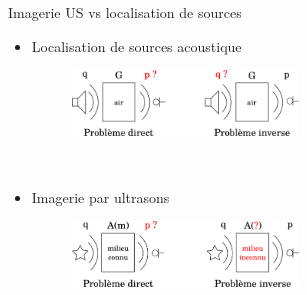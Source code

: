 \begin{frame}{Imagerie US vs localisation de sources}
	\begin{itemize}
		\item<1-> Localisation de sources acoustique
		\begin{figure}
			\includegraphics[width = 6cm]{./img/pd_dir_inv/ac.png}
		\end{figure}~\\
		\item<2-> Imagerie par ultrasons
		\begin{figure}
			\includegraphics[width = 6cm]{./img/pd_dir_inv/us.png}
		\end{figure}
	\end{itemize}
	
\end{frame}

